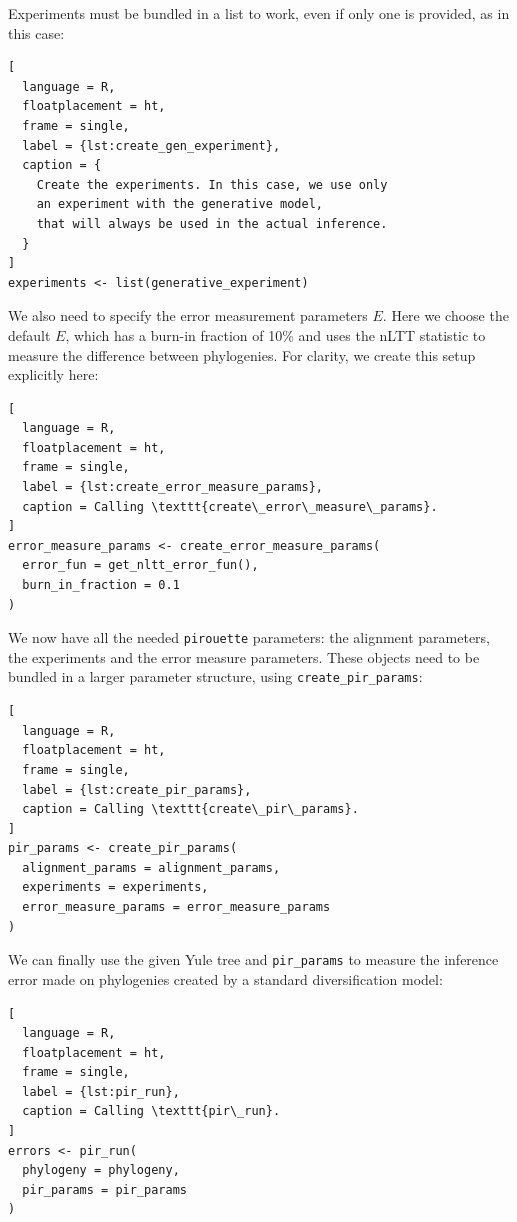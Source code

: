 Experiments must be bundled in a list to work, even if only one is provided, as 
in this case:

\begin{lstlisting}[
  language = R, 
  floatplacement = ht,
  frame = single,
  label = {lst:create_gen_experiment},
  caption = {
    Create the experiments. In this case, we use only
    an experiment with the generative model,
    that will always be used in the actual inference.
  }
]
experiments <- list(generative_experiment)
\end{lstlisting}

We also need to specify the error measurement parameters $\mathit{E}$.
Here we choose the default $\mathit{E}$, which has a burn-in fraction 
of 10\% and uses the nLTT statistic to
measure the difference between phylogenies. For clarity,
we create this setup explicitly here:

\begin{lstlisting}[
  language = R,
  floatplacement = ht,
  frame = single,
  label = {lst:create_error_measure_params},
  caption = Calling \texttt{create\_error\_measure\_params}.
]
error_measure_params <- create_error_measure_params(
  error_fun = get_nltt_error_fun(),
  burn_in_fraction = 0.1
)
\end{lstlisting}

We now have all the needed \verb;pirouette; parameters: the alignment 
parameters, the experiments and the error measure parameters.
These objects need to be bundled in a larger parameter structure, 
using \verb;create_pir_params;:

\begin{lstlisting}[
  language = R,
  floatplacement = ht,
  frame = single,
  label = {lst:create_pir_params},
  caption = Calling \texttt{create\_pir\_params}.
]
pir_params <- create_pir_params(
  alignment_params = alignment_params,
  experiments = experiments,
  error_measure_params = error_measure_params
)
\end{lstlisting}

We can finally use the given Yule tree and \verb;pir_params; to measure the 
inference error made on phylogenies
created by a standard diversification model:

\begin{lstlisting}[
  language = R,
  floatplacement = ht,
  frame = single,
  label = {lst:pir_run},
  caption = Calling \texttt{pir\_run}.
]
errors <- pir_run(
  phylogeny = phylogeny,
  pir_params = pir_params
)
\end{lstlisting}

